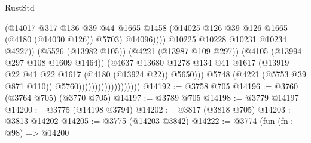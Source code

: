 \begin{lexlean}{RustStd}
\begin{coremodule}
{\begin{coremodule}
{{{{{{{{{{{{{{{{{{{{{{{{{{{{{{{                                                      (@14017
                                                        @317
                                                        @136
                                                        @39
                                                        @44
                                                        @1665
                                                        @1458
                                                        (@14025
                                                          @126
                                                          @39
                                                          @126
                                                          @1665
                                                          (@4180 (@14030 @126))
                                                          @5703)
                                                        @14096))))
                                                @10225
                                                @10228
                                                @10231
                                                @10234
                                                @4227))
                                            (@5526 (@13982 @105))
                                            (@4221 (@13987 @109 @297))
                                            (@4105 (@13994 @297 @108 @1609 @1464))
                                            (@4637
                                              @13680
                                              @1278
                                              @134
                                              @41
                                              @1617
                                              (@13919
                                                @22
                                                @41
                                                @22
                                                @1617
                                                (@4180 (@13924 @22))
                                                @5650)))
                                          @5748
                                          (@4221 (@5753 @39 @871 @110))
                                          @5760)))))))))))))))))))
@14192 := @3758 @705
@14196 := @3760 (@3764 @705) (@3770 @705)
@14197 := @3789 @705
@14198 := @3779 @14197
@14200 := @3775 (@14198 @3794)
@14202 := @3817 (@3818 @705)
@14203 := @3813 @14202
@14205 := @3775 (@14203 @3842)
@14222 := @3774
    (fun (fn : @98) =>
    @14200
}}}}}}}}}}}}}}}}}}}}}}}}}}}}}}}
\end{coremodule}}
\end{coremodule}
\end{lexlean}
